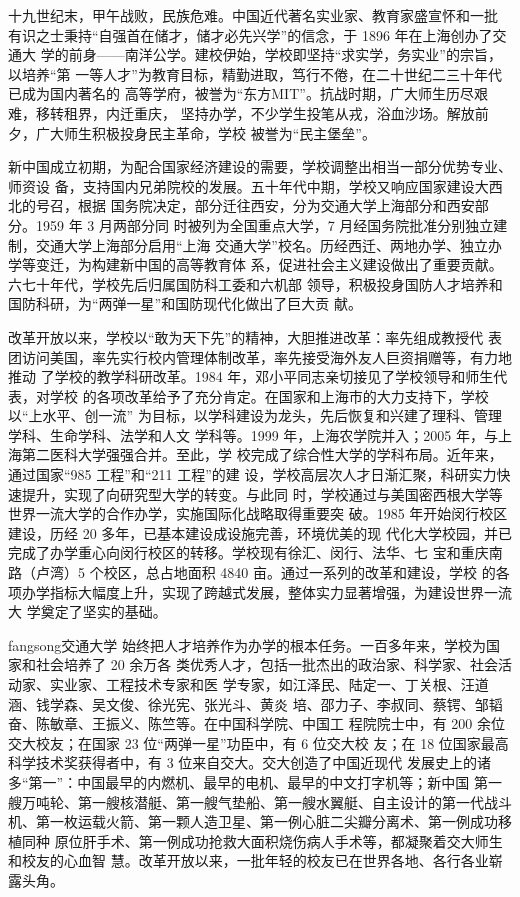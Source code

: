 {\songti 十九世纪末，甲午战败，民族危难。中国近代著名实业家、教育家盛宣怀和一批
  有识之士秉持“自强首在储才，储才必先兴学”的信念，于 1896 年在上海创办了交通大
  学的前身——南洋公学。建校伊始，学校即坚持“求实学，务实业”的宗旨，以培养“第
  一等人才”为教育目标，精勤进取，笃行不倦，在二十世纪二三十年代已成为国内著名的
  高等学府，被誉为“东方MIT”。抗战时期，广大师生历尽艰难，移转租界，内迁重庆，
  坚持办学，不少学生投笔从戎，浴血沙场。解放前夕，广大师生积极投身民主革命，学校
  被誉为“民主堡垒”。
  
  新中国成立初期，为配合国家经济建设的需要，学校调整出相当一部分优势专业、师资设
  备，支持国内兄弟院校的发展。五十年代中期，学校又响应国家建设大西北的号召，根据
  国务院决定，部分迁往西安，分为交通大学上海部分和西安部分。1959 年 3 月两部分同
  时被列为全国重点大学，7 月经国务院批准分别独立建制，交通大学上海部分启用“上海
  交通大学”校名。历经西迁、两地办学、独立办学等变迁，为构建新中国的高等教育体
  系，促进社会主义建设做出了重要贡献。六七十年代，学校先后归属国防科工委和六机部
  领导，积极投身国防人才培养和国防科研，为“两弹一星”和国防现代化做出了巨大贡
  献。}

{\heiti 改革开放以来，学校以“敢为天下先”的精神，大胆推进改革：率先组成教授代
  表团访问美国，率先实行校内管理体制改革，率先接受海外友人巨资捐赠等，有力地推动
  了学校的教学科研改革。1984 年，邓小平同志亲切接见了学校领导和师生代表，对学校
  的各项改革给予了充分肯定。在国家和上海市的大力支持下，学校以“上水平、创一流”
  为目标，以学科建设为龙头，先后恢复和兴建了理科、管理学科、生命学科、法学和人文
  学科等。1999 年，上海农学院并入；2005 年，与上海第二医科大学强强合并。至此，学
  校完成了综合性大学的学科布局。近年来，通过国家“985 工程”和“211 工程”的建
  设，学校高层次人才日渐汇聚，科研实力快速提升，实现了向研究型大学的转变。与此同
  时，学校通过与美国密西根大学等世界一流大学的合作办学，实施国际化战略取得重要突
  破。1985 年开始闵行校区建设，历经 20 多年，已基本建设成设施完善，环境优美的现
  代化大学校园，并已完成了办学重心向闵行校区的转移。学校现有徐汇、闵行、法华、七
  宝和重庆南路（卢湾）5 个校区，总占地面积 4840 亩。通过一系列的改革和建设，学校
  的各项办学指标大幅度上升，实现了跨越式发展，整体实力显著增强，为建设世界一流大
  学奠定了坚实的基础。}

{\ifcsname fangsong\endcsname\fangsong\else[无 \cs{fangsong} 字体。]\fi 交通大学
  始终把人才培养作为办学的根本任务。一百多年来，学校为国家和社会培养了 20 余万各
  类优秀人才，包括一批杰出的政治家、科学家、社会活动家、实业家、工程技术专家和医
  学专家，如江泽民、陆定一、丁关根、汪道涵、钱学森、吴文俊、徐光宪、张光斗、黄炎
  培、邵力子、李叔同、蔡锷、邹韬奋、陈敏章、王振义、陈竺等。在中国科学院、中国工
  程院院士中，有 200 余位交大校友；在国家 23 位“两弹一星”功臣中，有 6 位交大校
  友；在 18 位国家最高科学技术奖获得者中，有 3 位来自交大。交大创造了中国近现代
  发展史上的诸多“第一”：中国最早的内燃机、最早的电机、最早的中文打字机等；新中国
  第一艘万吨轮、第一艘核潜艇、第一艘气垫船、第一艘水翼艇、自主设计的第一代战斗
  机、第一枚运载火箭、第一颗人造卫星、第一例心脏二尖瓣分离术、第一例成功移植同种
  原位肝手术、第一例成功抢救大面积烧伤病人手术等，都凝聚着交大师生和校友的心血智
  慧。改革开放以来，一批年轻的校友已在世界各地、各行各业崭露头角。}

